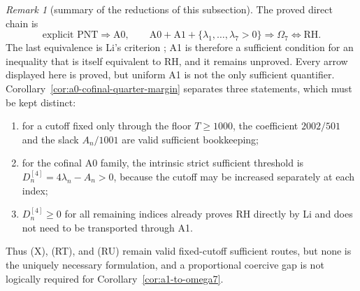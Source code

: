 \documentclass[11pt]{amsart}
\theoremstyle{definition}
\theoremstyle{remark}
\newtheorem{remark}[theorem]{Remark}
\theoremstyle{definition}
\newcommand{\RH}{\mathrm{RH}}
\begin{document}
\begin{remark}[summary of the reductions of this subsection]\label{rmk:a1-status-current}
The proved direct chain is
\[
 \text{explicit PNT}\Longrightarrow\mathrm{A0},\qquad
 \mathrm{A0}+\mathrm{A1}+\{\lambda_1,\ldots,\lambda_7>0\}
 \Longrightarrow\Omega_7\Longleftrightarrow\RH.
\]
The last equivalence is Li's criterion \cite{Li}; A1 is therefore a
sufficient condition for an inequality that is itself equivalent to RH, and
it remains unproved.
Every arrow displayed here is proved, but uniform A1 is not the only
sufficient quantifier.  Corollary~\ref{cor:a0-cofinal-quarter-margin}
separates three statements, which must be kept distinct:
\begin{enumerate}
\item for a cutoff fixed only through the floor $T\ge1000$, the coefficient
      $2002/501$ and the slack $A_n/1001$ are valid sufficient bookkeeping;
\item for the cofinal A0 family, the intrinsic strict sufficient threshold is
      $D_n^{[4]}=4\lambda_n-A_n>0$, because the cutoff may be increased
      separately at each index;
\item $D_n^{[4]}\ge0$ for all remaining indices already proves RH directly
      by Li and does not need to be transported through A1.
\end{enumerate}
Thus (X), (RT), and (RU) remain valid fixed-cutoff sufficient routes, but
none is the uniquely necessary formulation, and a proportional coercive gap is
not logically required for Corollary~\ref{cor:a1-to-omega7}.


\end{remark}
\end{document}

